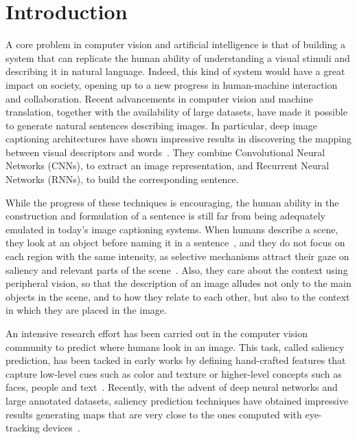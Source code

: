 


\section{Introduction}
A core problem in computer vision and artificial intelligence is that of building a system that can replicate the human ability of understanding a visual stimuli and describing it in natural language. Indeed, this kind of system would have a great impact on society, opening up to a new progress in human-machine interaction and collaboration.
Recent advancements in computer vision and machine translation, together with the availability of large datasets, have made it possible to generate natural sentences describing images.  
In particular, deep image captioning architectures have shown impressive results in discovering the mapping between visual descriptors and words~\cite{karpathy2015deep,vinyals2015show,icml2015xuc15,you2016image}. They combine Convolutional Neural Networks (CNNs), to extract an image representation, and Recurrent Neural Networks (RNNs), to build the corresponding sentence. 

While the progress of these techniques is encouraging, the human ability in the construction and formulation of a sentence is still far from being adequately emulated in today's image captioning systems. When humans describe a scene, they look at an object before naming it in a sentence~\cite{griffin2000eyes}, and they do not focus on each region with the same intensity, as selective mechanisms attract their gaze on saliency and relevant parts of the scene~\cite{Rensink2000}. Also, they care about the context using peripheral vision, so that the description of an image alludes not only to the main objects in the scene, and to how they relate to each other, but also to the context in which they are placed in the image. 

An intensive research effort has been carried out in the computer vision community to predict where humans look in an image. This task, called saliency prediction, has been tacked in early works by defining hand-crafted features that capture low-level cues such as color and texture or higher-level concepts such as faces, people and text~\cite{itti1998model,borji2012boosting,judd2009learning}. Recently, with the advent of deep neural networks and large annotated datasets, saliency prediction techniques have obtained impressive results generating maps that are very close to the ones computed with eye-tracking devices~\cite{mlnet2016,jetley2016end,huang2015salicon}.

